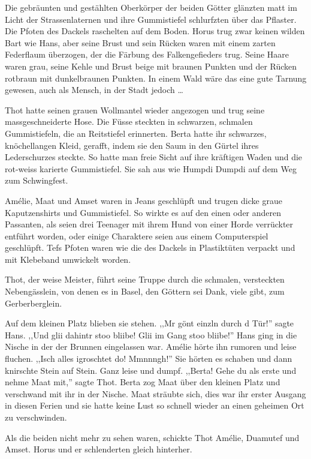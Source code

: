 \documentclass[11pt,titlepage,a5paper]{book}
\begin{document}
Die gebräunten und gestählten Oberkörper der beiden Götter glänzten matt im Licht der Strassenlaternen und ihre Gummistiefel  schlurfzten über das Pflaster. Die Pfoten des Dackels raschelten auf dem Boden. Horus trug zwar keinen wilden Bart wie Hans, aber seine Brust und sein Rücken waren mit einem zarten Federflaum überzogen, der die Färbung des Falkengefieders trug. Seine Haare waren grau, seine Kehle und Brust beige mit braunen Punkten und der Rücken rotbraun mit dunkelbraunen Punkten. In einem Wald wäre das eine gute Tarnung gewesen, auch als Mensch, in der Stadt jedoch \dots

Thot hatte seinen grauen Wollmantel wieder angezogen und trug seine massgeschneiderte Hose. Die Füsse steckten in schwarzen, schmalen Gummistiefeln, die an Reitstiefel erinnerten. Berta hatte ihr schwarzes, knöchellangen Kleid, gerafft, indem sie den Saum in den Gürtel ihres Lederschurzes steckte. So hatte man freie Sicht auf ihre kräftigen Waden und die rot-weiss karierte Gummistiefel. Sie sah aus wie Humpdi Dumpdi auf dem Weg zum Schwingfest.

 Amélie, Maat und Amset waren in Jeans geschlüpft und trugen dicke graue Kaputzenshirts und Gummistiefel. So wirkte es auf den einen oder anderen Passanten, als seien drei Teenager mit ihrem Hund von einer Horde verrückter entführt worden, oder einige Charaktere seien aus einem Computerspiel geschlüpft. Tefs Pfoten waren wie die des Dackels in Plastiktüten verpackt und mit Klebeband umwickelt worden.

Thot, der weise Meister, führt seine Truppe durch die schmalen, versteckten Nebengässlein, von denen es in Basel, den Göttern sei Dank, viele gibt, zum Gerberberglein.

Auf dem kleinen Platz blieben sie stehen. ,,Mr gönt einzln durch d Tür!'' sagte Hans. ,,Und glii dahintr stoo bliibe! Glii im Gang stoo bliibe!'' Hans ging in die Nische in der der Brunnen eingelassen war. Amélie hörte ihn rumoren und leise fluchen. ,,Isch alles igroschtet do! Mmnnngh!'' Sie hörten es schaben und dann knirschte Stein auf Stein. Ganz leise und dumpf. ,,Berta! Gehe du als erste und nehme Maat mit,'' sagte Thot. Berta zog Maat über den kleinen Platz und verschwand mit ihr in der Nische. Maat sträubte sich, dies war ihr erster Ausgang in diesen Ferien und sie hatte keine Lust so schnell wieder an einen geheimen Ort zu verschwinden.

Als die beiden nicht mehr zu sehen waren, schickte Thot Amélie, Duamutef und Amset. Horus und er schlenderten gleich hinterher. 
\end{document}
